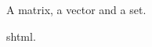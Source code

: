 \documentclass{report}
\begin{document}
A \gls{matrix}, a \gls{vector} and a \gls{set}.

\gls{shtml}.

\printunsrtglossaries
\end{document}
